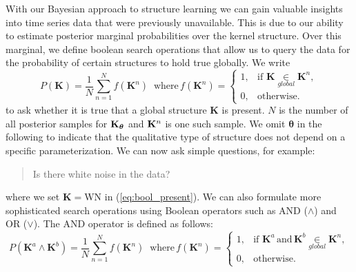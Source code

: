 With our Bayesian approach to structure learning we can gain valuable insights
into time series data that were previously unavailable.
This is due to our ability to estimate posterior marginal probabilities over the kernel structure.
Over this marginal, we define boolean search operations that allow us to query the data
for the probability of certain structures to hold true globally.
We write
\begin{equation}
\label{eq:bool_present}
P(\mathbf{K}) = \frac{1}{N}
\sum\limits_{n=1}^N f(\mathbf{K}^n)\;\;\text{where}\, f(\mathbf{K}^n) = \begin{cases}
  1, & \text{if } \mathbf{K} \underset{global}{\in} \mathbf{K}^n, \\
  0, & \text{otherwise}.
\end{cases} 
\end{equation}
to ask whether it is true that a global structure $\mathbf{K}$ is present. $N$
is the number of all posterior samples for $\mathbf{K}_{\bm{\theta}}$ and $\mathbf{K}^n$ is one such
sample. We omit $\bm{\theta}$ in the following to indicate that the qualitative
type of structure does not depend on a specific parameterization. 
We can now ask simple questions, for example:
\begin{quotation}
Is there white noise in the data?
\end{quotation}
where we set $\mathbf{K} = $WN in (\ref{eq:bool_present}).
We can also formulate more sophisticated search operations using Boolean operators such as AND ($\land$) and OR ($\lor$).
The AND operator is defined as follows:
\begin{equation}
P(\mathbf{K}^a \land \mathbf{K}^b)  = \frac{1}{N}
\sum\limits_{n=1}^N f(\mathbf{K}^n)\;\;\text{where}\,f(\mathbf{K}^n) = \begin{cases}
  1, & \text{if } \mathbf{K}^a\, \text{and}\, \mathbf{K}^b  \underset{global}{\in} \mathbf{K}^n, \\
  0, & \text{otherwise}.
\end{cases}
\end{equation}
